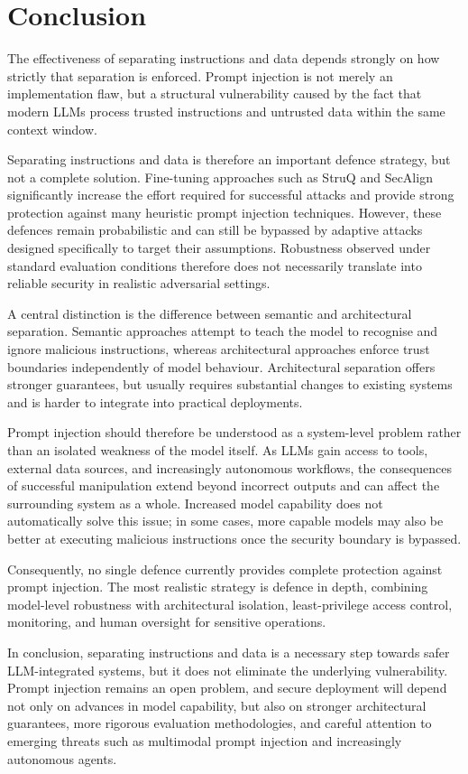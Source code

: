 \section{Conclusion}
\label{sec:fazit}

The effectiveness of separating instructions and data depends strongly on how
strictly that separation is enforced. Prompt injection is not merely an
implementation flaw, but a structural vulnerability caused by the fact that
modern LLMs process trusted instructions and untrusted data within the same
context window.

Separating instructions and data is therefore an important defence strategy,
but not a complete solution. Fine-tuning approaches such as StruQ and SecAlign
significantly increase the effort required for successful attacks and provide
strong protection against many heuristic prompt injection techniques. However,
these defences remain probabilistic and can still be bypassed by adaptive
attacks designed specifically to target their assumptions. Robustness observed
under standard evaluation conditions therefore does not necessarily translate
into reliable security in realistic adversarial settings.

A central distinction is the difference between semantic and architectural
separation. Semantic approaches attempt to teach the model to recognise and
ignore malicious instructions, whereas architectural approaches enforce trust
boundaries independently of model behaviour. Architectural separation offers
stronger guarantees, but usually requires substantial changes to existing
systems and is harder to integrate into practical deployments.

Prompt injection should therefore be understood as a system-level problem rather
than an isolated weakness of the model itself. As LLMs gain access to tools,
external data sources, and increasingly autonomous workflows, the consequences
of successful manipulation extend beyond incorrect outputs and can affect the
surrounding system as a whole. Increased model capability does not
automatically solve this issue; in some cases, more capable models may also be
better at executing malicious instructions once the security boundary is
bypassed.

Consequently, no single defence currently provides complete protection against
prompt injection. The most realistic strategy is defence in depth, combining
model-level robustness with architectural isolation, least-privilege access
control, monitoring, and human oversight for sensitive operations.

In conclusion, separating instructions and data is a necessary step towards
safer LLM-integrated systems, but it does not eliminate the underlying
vulnerability. Prompt injection remains an open problem, and secure deployment
will depend not only on advances in model capability, but also on stronger
architectural guarantees, more rigorous evaluation methodologies, and careful
attention to emerging threats such as multimodal prompt injection and
increasingly autonomous agents.
